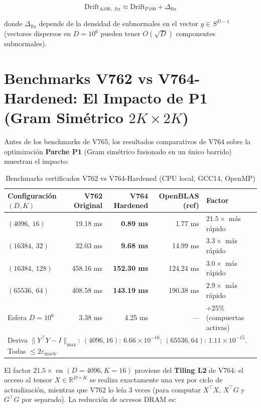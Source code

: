 \begin{equation}
  \text{Drift}_{\text{A100, .ftz}} \approx \text{Drift}_{\text{P100}} + \Delta_{\text{ftz}}
\end{equation}

donde $\Delta_{\text{ftz}}$ depende de la densidad de subnormales en el vector $y \in S^{D-1}$
(vectores dispersos en $D = 10^6$ pueden tener $O(\sqrt{D})$ componentes subnormales).

\section{Benchmarks V762 vs V764-Hardened: El Impacto de P1 (Gram Simétrico $2K \times 2K$)}

Antes de los benchmarks de V765, los resultados comparativos de V764 sobre la optimización
\textbf{Parche P1} (Gram simétrico fusionado en un único barrido) muestran el impacto:

\begin{table}[htbp]
\centering
\caption{Benchmarks certificados V762 vs V764-Hardened (CPU local, GCC14, OpenMP)}
\label{tab:v762_vs_v764}
\begin{tabular}{@{}lrrrl@{}}
\toprule
Configuración $(D, K)$ & V762 Original & V764 Hardened & OpenBLAS (ref) & Factor \\
\midrule
$(4096,\ 16)$  & 19.18 ms & \textbf{0.89 ms}   & 1.77 ms  & $21.5\times$ más rápido \\
$(16384,\ 32)$ & 32.03 ms & \textbf{9.68 ms}   & 14.99 ms & $3.3\times$ más rápido \\
$(16384,\ 128)$& 458.16 ms & \textbf{152.30 ms} & 124.24 ms & $3.0\times$ más rápido \\
$(65536,\ 64)$ & 408.58 ms & \textbf{143.19 ms} & 190.38 ms & $2.9\times$ más rápido \\
Esfera $D=10^6$ & 3.38 ms & 4.25 ms            & —         & $+25\%$ (compuertas activas) \\
\bottomrule
\multicolumn{5}{l}{\footnotesize Deriva $\|Y^\top Y - I\|_{\max}$: $(4096,16)$: $6.66\times10^{-16}$;
$(65536,64)$: $1.11\times10^{-15}$. Todas $\le 2\varepsilon_{\text{mach}}$.}
\end{tabular}
\end{table}

El factor $21.5\times$ en $(D=4096, K=16)$ proviene del \textbf{Tiling L2} de V764:
el acceso al tensor $X \in \mathbb{R}^{D \times K}$ se realiza exactamente una vez por
ciclo de actualización, mientras que V762 lo leía 3 veces (para computar $X^\top X$,
$X^\top G$ y $G^\top G$ por separado). La reducción de accesos DRAM es:

